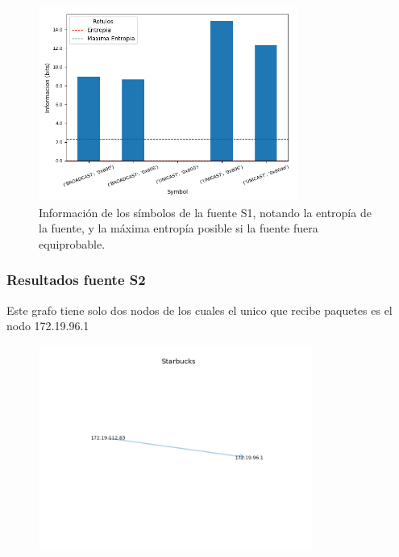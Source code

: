 \begin{figure}[H]
  \centering
  \includegraphics[width=8.5cm]{figs/information_starbucks_S1_output.png}
  \caption{\normalfont Información de los símbolos de la fuente S1, notando la entropía de la fuente, y la máxima entropía posible si la fuente fuera equiprobable.}
\end{figure}

\subsubsection*{Resultados fuente S2}

Este grafo tiene solo dos nodos de los cuales el unico que recibe paquetes es el nodo 172.19.96.1

\begin{figure}[H]
 \centering
	\includegraphics[width=0.8\textwidth]{figs/starbucks.png}
	\caption{}
	\label{fig:domicilio-grafo}
\end{figure}
